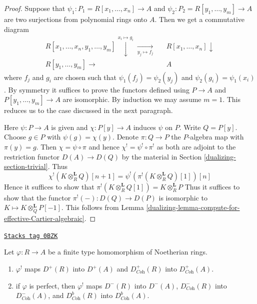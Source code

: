 \begin{proof}

Suppose that $\psi_1 : P_1 = R[x_1, \ldots, x_n] \to A$ and
$\psi_2 : P_2 = R[y_1, \ldots, y_m] \to A$ are two
surjections from polynomial rings onto $A$. Then we get a
commutative diagram
$$
\begin{array}{ccc}R[x_1, \ldots, x_n, y_1, \ldots, y_m]
\overset{x_i \mapsto g_i}{\downarrow}\underset{y_j \mapsto f_j}{\longrightarrow} &  & R[x_1, \ldots, x_n] \downarrow \\ R[y_1, \ldots, y_m] \longrightarrow &  & A\end{array}
$$
where $f_j$ and $g_i$ are chosen such that $\psi_1(f_j) = \psi_2(y_j)$
and $\psi_2(g_i) = \psi_1(x_i)$. By symmetry it suffices to prove
the functors defined using $P \to A$ and $P[y_1, \ldots, y_m] \to A$
are isomorphic. By induction we may assume $m = 1$. This reduces
us to the case discussed in the next paragraph.

\medskip\noindent
Here $\psi : P \to A$ is given and $\chi : P[y] \to A$ induces
$\psi$ on $P$. Write $Q = P[y]$.
Choose $g \in P$ with $\psi(g) = \chi(y)$.
Denote $\pi : Q \to P$ the $P$-algebra map
with $\pi(y) = g$. Then $\chi = \psi \circ \pi$ and hence
$\chi^! = \psi^! \circ \pi^!$ as both are
adjoint to the restriction functor $D(A) \to D(Q)$ by the material
in Section \ref{dualizing-section-trivial}. Thus
$$
\chi^!\left(K \otimes_R^\mathbf{L} Q\right)[n + 1] =
\psi^!\left(\pi^!\left(K \otimes_R^\mathbf{L} Q\right)[1]\right)[n]
$$
Hence it suffices to show that
$\pi^!(K \otimes_R^\mathbf{L} Q[1]) = K \otimes_R^\mathbf{L} P$
Thus it suffices to show that the functor
$\pi^!(-) : D(Q) \to D(P)$
is isomorphic to $K \mapsto K \otimes_Q^\mathbf{L} P[-1]$.
This follows from Lemma \ref{dualizing-lemma-compute-for-effective-Cartier-algebraic}.
\end{proof}

\begin{lemma}
\label{dualizing-lemma-shriek-boundedness}
\href{https://stacks.math.columbia.edu/tag/0BZK}{\texttt{Stacks tag 0BZK}}

Let $\varphi : R \to A$ be a finite type homomorphism of Noetherian rings.
\begin{enumerate}
\item $\varphi^!$ maps $D^+(R)$ into $D^+(A)$ and
$D^+_{\textit{Coh}}(R)$ into $D^+_{\textit{Coh}}(A)$.
\item if $\varphi$ is perfect, then $\varphi^!$ maps
$D^-(R)$ into $D^-(A)$,
$D^-_{\textit{Coh}}(R)$ into $D^-_{\textit{Coh}}(A)$, and
$D^b_{\textit{Coh}}(R)$ into $D^b_{\textit{Coh}}(A)$.
\end{enumerate}
\end{lemma}

